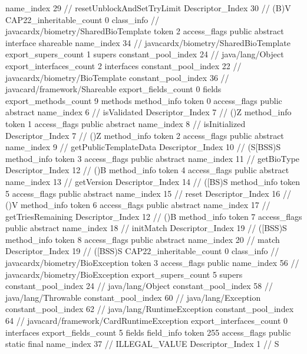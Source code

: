 {{{{{					name_index	29		// resetUnblockAndSetTryLimit
					Descriptor_Index	30		// (B)V
				}
			}
			CAP22_inheritable_count	0
		}
		class_info {		// javacardx/biometry/SharedBioTemplate
			token	2
			access_flags	public abstract interface shareable
			name_index	34		// javacardx/biometry/SharedBioTemplate
			export_supers_count	1
			supers {
				constant_pool_index	24		// java/lang/Object
			}
			export_interfaces_count	2
			interfaces {
				constant_pool_index	22		// javacardx/biometry/BioTemplate
				constant_pool_index	36		// javacard/framework/Shareable
			}
			export_fields_count	0
			fields {
			}
			export_methods_count	9
			methods {
				method_info {
					token	0
					access_flags	public abstract
					name_index	6		// isValidated
					Descriptor_Index	7		// ()Z
				}
				method_info {
					token	1
					access_flags	public abstract
					name_index	8		// isInitialized
					Descriptor_Index	7		// ()Z
				}
				method_info {
					token	2
					access_flags	public abstract
					name_index	9		// getPublicTemplateData
					Descriptor_Index	10		// (S[BSS)S
				}
				method_info {
					token	3
					access_flags	public abstract
					name_index	11		// getBioType
					Descriptor_Index	12		// ()B
				}
				method_info {
					token	4
					access_flags	public abstract
					name_index	13		// getVersion
					Descriptor_Index	14		// ([BS)S
				}
				method_info {
					token	5
					access_flags	public abstract
					name_index	15		// reset
					Descriptor_Index	16		// ()V
				}
				method_info {
					token	6
					access_flags	public abstract
					name_index	17		// getTriesRemaining
					Descriptor_Index	12		// ()B
				}
				method_info {
					token	7
					access_flags	public abstract
					name_index	18		// initMatch
					Descriptor_Index	19		// ([BSS)S
				}
				method_info {
					token	8
					access_flags	public abstract
					name_index	20		// match
					Descriptor_Index	19		// ([BSS)S
				}
			}
			CAP22_inheritable_count	0
		}
		class_info {		// javacardx/biometry/BioException
			token	3
			access_flags	public
			name_index	56		// javacardx/biometry/BioException
			export_supers_count	5
			supers {
				constant_pool_index	24		// java/lang/Object
				constant_pool_index	58		// java/lang/Throwable
				constant_pool_index	60		// java/lang/Exception
				constant_pool_index	62		// java/lang/RuntimeException
				constant_pool_index	64		// javacard/framework/CardRuntimeException
			}
			export_interfaces_count	0
			interfaces {
			}
			export_fields_count	5
			fields {
			field_info {
				token	255
				access_flags	public static final
				name_index	37		// ILLEGAL_VALUE
				Descriptor_Index	1		// S
}}}}}
